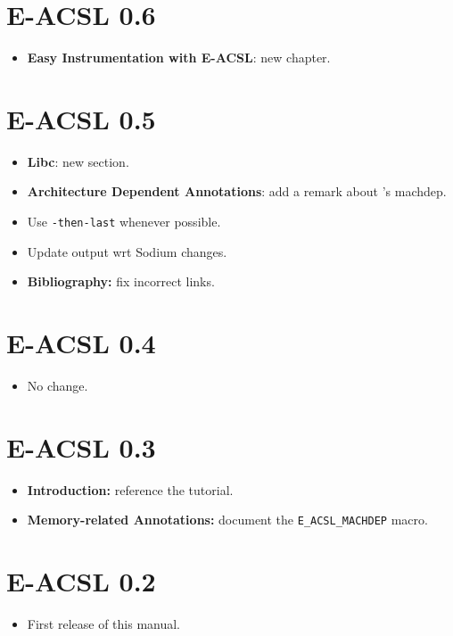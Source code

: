 \section*{E-ACSL 0.6}

\begin{itemize}
\item \textbf{Easy Instrumentation with E-ACSL}: new chapter.
\end{itemize}

\section*{E-ACSL 0.5}

\begin{itemize}
\item \textbf{Libc}: new section.
\item \textbf{Architecture Dependent Annotations}: add a remark about \gcc's
  machdep.
\item Use \texttt{-then-last} whenever possible.
\item Update output wrt \framac Sodium changes.
\item \textbf{Bibliography:} fix incorrect links.
\end{itemize}

\section*{E-ACSL 0.4}

\begin{itemize}
\item No change.
\end{itemize}

\section*{E-ACSL 0.3}
\begin{itemize}
\item \textbf{Introduction:} reference the \eacsl tutorial.
\item \textbf{Memory-related Annotations:} document the
  \lstinline|E_ACSL_MACHDEP| macro.
\end{itemize}

\section*{E-ACSL 0.2}

\begin{itemize}
\item First release of this manual.
\end{itemize}
